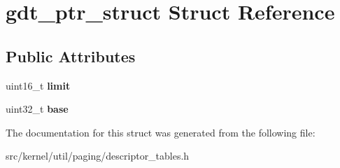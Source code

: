 \hypertarget{structgdt__ptr__struct}{}\section{gdt\+\_\+ptr\+\_\+struct Struct Reference}
\label{structgdt__ptr__struct}
\subsection*{Public Attributes}
\begin{DoxyCompactItemize}
\item 
\mbox{\label{structgdt__ptr__struct_abf557ff0ca1cf3e130e8ab0086ab4ce6}} 
uint16\+\_\+t {\bfseries limit}
\item 
\mbox{\label{structgdt__ptr__struct_a9b351f31bc261f3c2c3a87252350fb9c}} 
uint32\+\_\+t {\bfseries base}
\end{DoxyCompactItemize}


The documentation for this struct was generated from the following file\+:\begin{DoxyCompactItemize}
\item 
src/kernel/util/paging/descriptor\+\_\+tables.\+h\end{DoxyCompactItemize}
